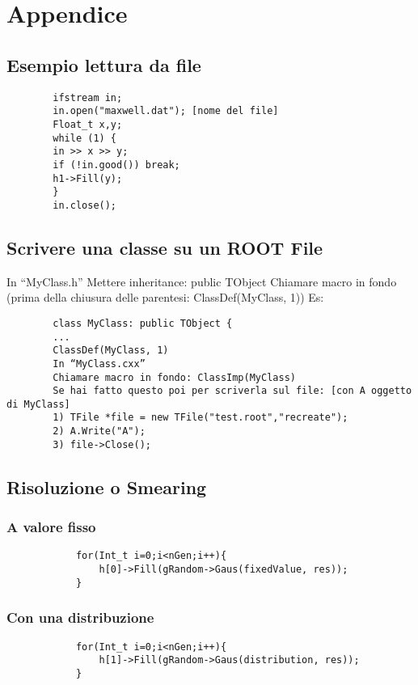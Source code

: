 \documentclass[a4paper]{article}
\begin{document}
\section{Appendice}
    \subsection{Esempio lettura da file}
    \begin{verbatim}
        ifstream in;
        in.open("maxwell.dat"); [nome del file]
        Float_t x,y;
        while (1) {
        in >> x >> y;
        if (!in.good()) break;
        h1->Fill(y);
        }
        in.close();
    \end{verbatim}
    \subsection{Scrivere una classe su un ROOT File}
    In “MyClass.h”
    Mettere inheritance: public TObject
    Chiamare macro in fondo (prima della chiusura delle parentesi:  ClassDef(MyClass, 1))
    Es:
    \begin{verbatim}
        class MyClass: public TObject {
        ...
        ClassDef(MyClass, 1)
        In “MyClass.cxx”
        Chiamare macro in fondo: ClassImp(MyClass)
        Se hai fatto questo poi per scriverla sul file: [con A oggetto di MyClass]
        1) TFile *file = new TFile("test.root","recreate");
        2) A.Write("A");
        3) file->Close();
    \end{verbatim}
    \subsection{Risoluzione o Smearing}
        \subsubsection{A valore fisso}
        \begin{verbatim}
            for(Int_t i=0;i<nGen;i++){
                h[0]->Fill(gRandom->Gaus(fixedValue, res));
            }
        \end{verbatim}
        \subsubsection{Con una distribuzione}
        \begin{verbatim}
            for(Int_t i=0;i<nGen;i++){
                h[1]->Fill(gRandom->Gaus(distribution, res));
            }
        \end{verbatim}
\end{document}
